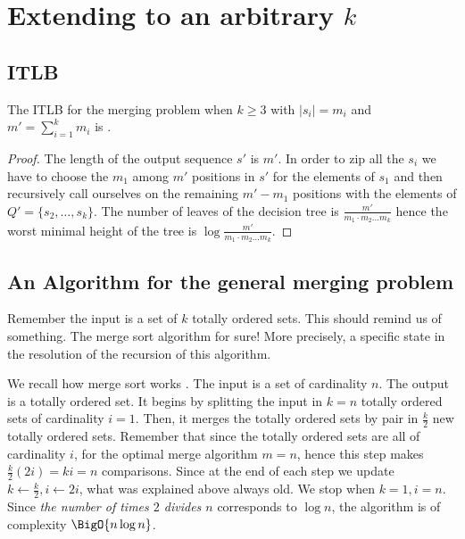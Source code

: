 \section{Extending to an arbitrary $k$}
\label{tree:merging:kgeq3}


\subsection{ITLB}
\label{tree:merging:kgeq3:ITLB}


\begin{theorem}
The ITLB for the merging problem when $k \geq 3$ with $|s_i| = m_i$ and $m' = \sum_{i=1}^{k} m_i$ is .
\end{theorem}

\begin{proof}
The length of the output sequence $s'$ is $m'$. In order to zip all the $s_i$ we have to choose the $m_1$ among $m'$ positions in $s'$ for the elements of $s_1$ and then recursively call ourselves on the remaining $m'-m_1$ positions with the elements of $Q' = \{s_2, \dots, s_k\}$. The number of leaves of the decision tree is $\frac{m'}{m_1 \cdot m_2 \dots m_k}$ hence the worst minimal height of the tree is $\log \frac{m'}{m_1 \cdot m_2 \dots m_k}$.
\end{proof}


\subsection{An Algorithm for the general merging problem}
\label{tree:merging:kgeq3:alg}

Remember the input is a set of $k$ totally ordered sets. This should remind us of something. The merge sort algorithm for sure! More precisely, a specific state in the resolution of the recursion of this algorithm.

We recall how merge sort works \cite{leiserson2001introduction}. The input is a set of cardinality $n$. The output is a totally ordered set. It begins by splitting the input in $k = n$ totally ordered sets of cardinality $i = 1$. Then, it merges the totally ordered sets by pair in $\frac{k}{2}$ new totally ordered sets. Remember that since the totally ordered sets are all of cardinality $i$, for the optimal merge algorithm $m=n$, hence this step makes $\frac{k}{2} (2 i) = k i = n$ comparisons. Since at the end of each step we update $k \gets \frac{k}{2}, i \gets 2i$, what was explained above always old. We stop when $k = 1, i = n$.
Since \emph{the number of times $2$ divides $n$} corresponds to $\log n$, the algorithm is of complexity $\BigO{n \log n}$.

